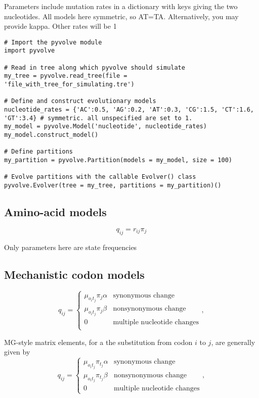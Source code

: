 \documentclass{article}
\begin{document}
Parameters include mutation rates in a dictionary with keys giving the two nucleotides. All models here symmetric, so AT=TA.
Alternatively, you may provide kappa. Other rates will be 1


\begin{lstlisting}
# Import the pyvolve module
import pyvolve

# Read in tree along which pyvolve should simulate
my_tree = pyvolve.read_tree(file = 'file_with_tree_for_simulating.tre')

# Define and construct evolutionary models
nucleotide_rates = {'AC':0.5, 'AG':0.2, 'AT':0.3, 'CG':1.5, 'CT':1.6, 'GT':3.4} # symmetric. all unspecified are set to 1.
my_model = pyvolve.Model('nucleotide', nucleotide_rates)
my_model.construct_model()

# Define partitions
my_partition = pyvolve.Partition(models = my_model, size = 100)

# Evolve partitions with the callable Evolver() class
pyvolve.Evolver(tree = my_tree, partitions = my_partition)()
\end{lstlisting}


\subsection{Amino-acid models}

\begin{equation}
q_{ij} = r_{ij} \pi_j
\end{equation}


Only parameters here are state frequencies

\subsection{Mechanistic codon models}


\begin{equation}\label{eq:GY94}
q_{ij} = \left\{ 
\begin{array}{rl}
\mu_{o_it_j} \pi_j \alpha      & \text{synonymous change} \\
\mu_{o_it_j} \pi_j \beta       & \text{nonsynonymous change} \\
0                    & \text{multiple nucleotide changes} \\             
\end{array} \right.,
\end{equation}


MG-style matrix elements, for a the substitution from codon $i$ to $j$, are generally given by 
\begin{equation}\label{eq:MGstyle}
q_{ij} = \left\{ 
\begin{array}{rl}
\mu_{o_it_j}\pi_{t_j} \alpha         &\text{synonymous change} \\
\mu_{o_it_j}\pi_{t_j} \beta  &\text{nonsynonymous change} \\
0                             &\text{multiple nucleotide changes}       
\end{array} \right. ,
\end{equation}
\end{document}
